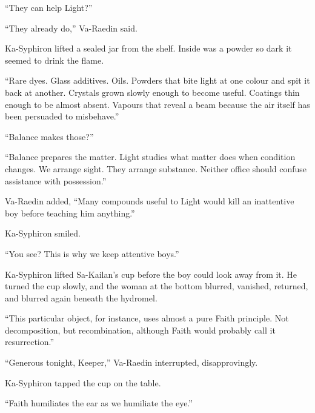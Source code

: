 “They can help Light?”\par

“They already do,” Va-Raedin said.\par

Ka-Syphiron lifted a sealed jar from the shelf.
Inside was a powder so dark it seemed to drink the flame.\par

“Rare dyes.
Glass additives.
Oils.
Powders that bite light at one colour and spit it back at another.
Crystals grown slowly enough to become useful.
Coatings thin enough to be almost absent.
Vapours that reveal a beam because the air itself has been persuaded to misbehave.”\par

“Balance makes those?”\par

“Balance prepares the matter.
Light studies what matter does when condition changes.
We arrange sight.
They arrange substance.
Neither office should confuse assistance with possession.”\par

Va-Raedin added, “Many compounds useful to Light would kill an inattentive boy before teaching him anything.”\par

Ka-Syphiron smiled.\par

“You see?
This is why we keep attentive boys.”\par




Ka-Syphiron lifted Sa-Kailan’s cup before the boy could look away from it.
He turned the cup slowly, and the woman at the bottom blurred, vanished, returned, and blurred again beneath the hydromel.\par

“This particular object, for instance, uses almost a pure Faith principle.
Not decomposition, but recombination, although Faith would probably call it resurrection.”\par

“Generous tonight, Keeper,” Va-Raedin interrupted, disapprovingly.\par

Ka-Syphiron tapped the cup on the table.\par

“Faith humiliates the ear as we humiliate the eye.”\par

